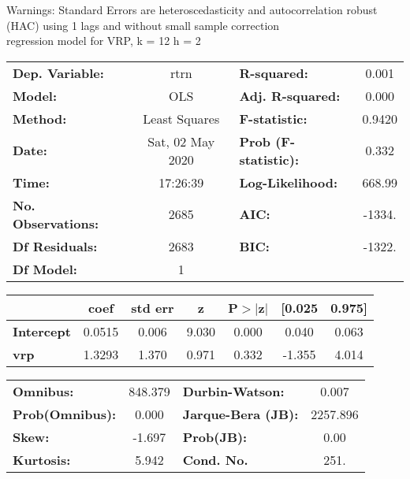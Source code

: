 Warnings: \newline
 [1] Standard Errors are heteroscedasticity and autocorrelation robust (HAC) using 1 lags and without small sample correction\\ 

regression model for VRP, k = 12 h = 2\begin{center}
\begin{tabular}{lclc}
\toprule
\textbf{Dep. Variable:}    &       rtrn       & \textbf{  R-squared:         } &     0.001   \\
\textbf{Model:}            &       OLS        & \textbf{  Adj. R-squared:    } &     0.000   \\
\textbf{Method:}           &  Least Squares   & \textbf{  F-statistic:       } &    0.9420   \\
\textbf{Date:}             & Sat, 02 May 2020 & \textbf{  Prob (F-statistic):} &    0.332    \\
\textbf{Time:}             &     17:26:39     & \textbf{  Log-Likelihood:    } &    668.99   \\
\textbf{No. Observations:} &        2685      & \textbf{  AIC:               } &    -1334.   \\
\textbf{Df Residuals:}     &        2683      & \textbf{  BIC:               } &    -1322.   \\
\textbf{Df Model:}         &           1      & \textbf{                     } &             \\
\bottomrule
\end{tabular}
\begin{tabular}{lcccccc}
                   & \textbf{coef} & \textbf{std err} & \textbf{z} & \textbf{P$> |$z$|$} & \textbf{[0.025} & \textbf{0.975]}  \\
\midrule
\textbf{Intercept} &       0.0515  &        0.006     &     9.030  &         0.000        &        0.040    &        0.063     \\
\textbf{vrp}       &       1.3293  &        1.370     &     0.971  &         0.332        &       -1.355    &        4.014     \\
\bottomrule
\end{tabular}
\begin{tabular}{lclc}
\textbf{Omnibus:}       & 848.379 & \textbf{  Durbin-Watson:     } &    0.007  \\
\textbf{Prob(Omnibus):} &   0.000 & \textbf{  Jarque-Bera (JB):  } & 2257.896  \\
\textbf{Skew:}          &  -1.697 & \textbf{  Prob(JB):          } &     0.00  \\
\textbf{Kurtosis:}      &   5.942 & \textbf{  Cond. No.          } &     251.  \\
\bottomrule
\end{tabular}
\end{center}

